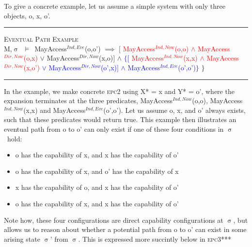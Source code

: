 \documentclass[a4paper,11pt, twoside,twocolumn]{article}
\newenvironment{logic}[1][]
{\begin{flushleft} \small }
{\end{flushleft}}
\newcommand{\loand}{$\land$}
\newcommand{\loor} {$\lor$}
\newcommand{\loimplies}{$\implies$}
\newcommand{\losigma}{$\upsigma$}
\newcommand{\loturns} {$\vDash$}
\newcommand{\ablock} {\null\qquad}
\begin{document}
To give a concrete example, let us assume a simple system with only three objects, o, x, o'.
\begin{logic}
\hrule\null
\textsc{\normalsize *Eventual Path Example}\\
M,\losigma\ \loturns\ MayAccess$^{Ind,Eve}$(o,o')\linebreak
\ablock \loimplies\linebreak
\ablock \ablock $[$\null
\textcolor{red}{MayAccess$^{Ind,Now}$(o,o) \loand\linebreak
\ablock \ablock \quad MayAccess$^{Dir,Now}$(o,x)\linebreak
}
\ablock \ablock \quad \loor \linebreak
\ablock \ablock MayAccess$^{Dir,Now}$(x,o)$ ]$\linebreak
\ablock \ablock \loand \linebreak
\textcolor{blue}{
\ablock \ablock $\{[$
\textcolor{red}{MayAccess$^{Ind,Now}$(x,x) \loand\linebreak
\ablock \ablock \quad MayAccess$^{Dir,Now}$(x,o')\linebreak}
\ablock \ablock \quad \quad \loor \linebreak
\ablock \ablock \quad MayAccess$^{Dir,Now}$(o',x)$]$\linebreak
\ablock \ablock \quad \loand \linebreak
\ablock \ablock \quad MayAccess$^{Ind,Eve}$(o',o')$\}$
}\linebreak
\ablock \ablock $\}$
\linebreak \\
\hrule
\end{logic}
In the example, we make concrete \textsc{epc2} using X* = x and Y* = o', where the expansion terminates at the three predicates, MayAccess$^{Ind,Now}$(o,o), MayAccess$^{Ind,Now}$(x,x) and MayAccess$^{Ind,Eve}$(o',o'). Let us assume o, x, and o' always exists, such that these predicates would return true. This example then illustrates an eventual path from o to o' can only exist if one of these four conditions in \losigma\ hold:
\begin{itemize}\setlength\itemsep{0.5em}
\item o has the capability of x, and x has the capability of o'
\item o has the capability of x, and o' has the capability of x
\item x has the capability of o, and x has the capability of o'
\item o has the capability of x, and x has the capability of o'
\end{itemize}
Note how, these four configurations are direct capability configurations at \losigma, but allows us to reason about whether a potential path from o to o' can exist in some arising state \losigma' from \losigma. This is expressed more succintly below in \textsc{epc3***}
\end{document}
